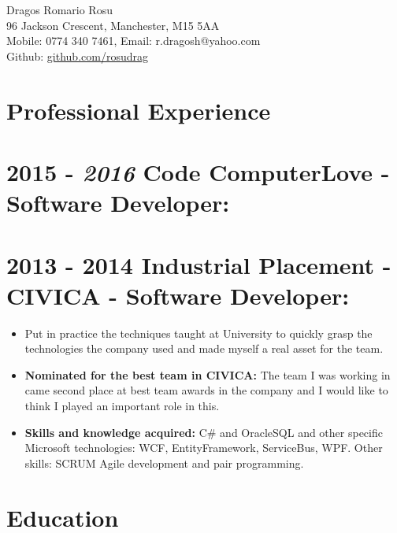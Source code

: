 \documentclass[12pt,a4paper]{res}
\begin{document}
\thispagestyle{empty}
  \begin{center}
  \Large{Dragos Romario Rosu  \\ [12pt]}
  \normalsize 96 Jackson Crescent, Manchester, M15 5AA\\
  Mobile: 0774 340 7461, Email: r.dragosh@yahoo.com\\
  Github: \url{github.com/rosudrag}
  \end{center}
  
\begin{resume}
\vspace{-10mm}
\section{\large\bf Professional Experience}

\section{\bf 2015 - \textit{2016} \hspace{0.3mm} Code ComputerLove - Software Developer:}
\vspace{5mm}    
\section{\bf 2013 - 2014 \hspace{0.5mm} Industrial Placement - CIVICA - Software Developer:}
\vspace{5mm}    
	\begin{itemize}
	\item[] Put in practice the techniques taught at University to quickly grasp the technologies the company used and made myself a real asset for the team.
	\item{\bf Nominated for the best team in CIVICA:} The team I was working in came second place at best team awards in the company and I would like to think I played an important role in this.
	\item{\bf Skills and knowledge acquired:} C\# and OracleSQL and other specific Microsoft technologies: WCF, EntityFramework, ServiceBus, WPF. Other skills: SCRUM Agile development and pair programming.
	\end{itemize}


\section{\large\bf Education}
\vspace{5mm}


\end{resume}
\end{document}
